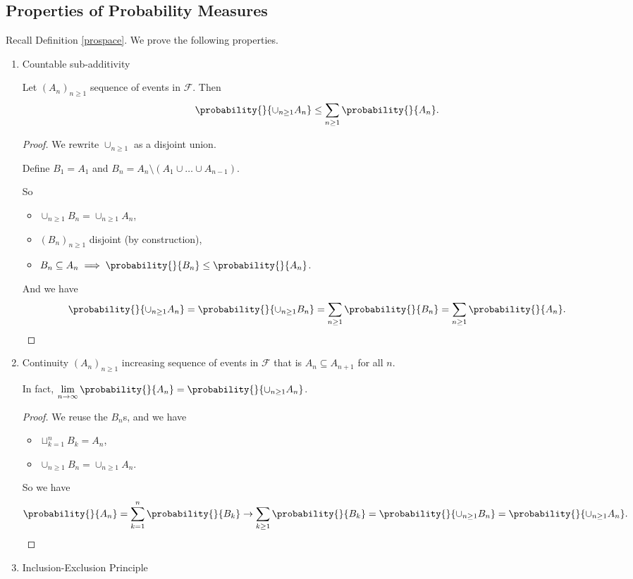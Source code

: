 \subsection{Properties of Probability Measures}
Recall Definition \eqref{prospace}. We prove the following properties.
\begin{property}
    \leavevmode
    \begin{enumerate}
        \item Countable sub-additivity

        Let \((A_n)_{n\geq 1}\) sequence of events in \(\mathcal{F} \). Then
        \[
            \probability{}{\cup_{n\geq 1}A_n}\leq \sum\limits_{n\geq 1}\probability{}{A_n} .
        \]
        \begin{proof}
            We rewrite \(\cup_{n\geq 1}\) as a disjoint union.
            
            Define \(B_1 = A_1\) and \(B_n = A_n \setminus (A_1\cup \ldots \cup A_{n-1} )\).

            So
            \begin{itemize}
                \item \(\cup_{n\geq 1} B_n = \cup_{n\geq 1}A_n\),
                \item \((B_n)_{n\geq 1}\) disjoint (by construction),
                \item \(B_n \subseteq A_n \implies \probability{}{B_n} \leq \probability{}{A_n}\).
            \end{itemize}

            And we have
            \[
                \probability{}{\cup_{n\geq 1}A_n} = \probability{}{\cup_{n\geq 1}B_n} = \sum\limits_{n\geq 1}\probability{}{B_n} = \sum\limits_{n\geq 1}\probability{}{A_n}.
            \]
        \end{proof}
        \item Continuity
        \((A_n)_{n\geq 1}\) increasing sequence of events in \(\mathcal{F} \) that is \(A_n \subseteq A_{n+1}\) for all \(n\).

        In fact, \(\lim\limits_{n \to \infty} \probability{}{A_n} = \probability{}{\cup_{n\geq 1}A_n} \).
        
        \begin{proof}
            We reuse the \(B_n\)s, and we have
            \begin{itemize}
                \item \(\sqcup_{k=1}^n B_k = A_n\),
                \item \(\cup_{n\geq 1}B_n = \cup_{n\geq 1}A_n\).
            \end{itemize}
            So we have
            \[
                \probability{}{A_n} =\sum\limits_{k=1}^{n} \probability{}{B_k} \to \sum\limits_{k\geq 1}^{}\probability{}{B_k}=\probability{}{\cup_{n\geq 1}B_{n}} = \probability{}{\cup_{n\geq 1}A_n}.
            \]
        \end{proof}
        \item Inclusion-Exclusion Principle


\end{enumerate}
\end{property}
